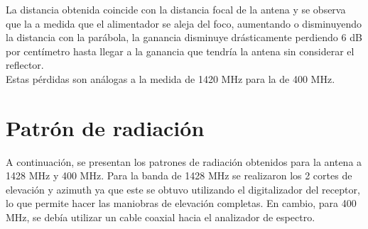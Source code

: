 La distancia obtenida coincide con la distancia focal de la antena y se observa que la a medida que el alimentador se aleja del foco, aumentando o disminuyendo la distancia con la parábola, la ganancia disminuye drásticamente perdiendo 6 dB por centímetro hasta llegar a la ganancia que tendría la antena sin considerar el reflector.\\

Estas pérdidas son análogas a la medida de 1420 MHz para la de 400 MHz.\\

\section{Patrón de radiación} \label{sec:patron}

A continuación, se presentan los patrones de radiación obtenidos para la antena a 1428 MHz y 400 MHz. Para la banda de 1428 MHz se realizaron los 2 cortes de elevación y azimuth ya que este se obtuvo utilizando el digitalizador del receptor, lo que permite hacer las maniobras de elevación completas. En cambio, para 400 MHz, se debía utilizar un cable coaxial hacia el analizador de espectro.\\



